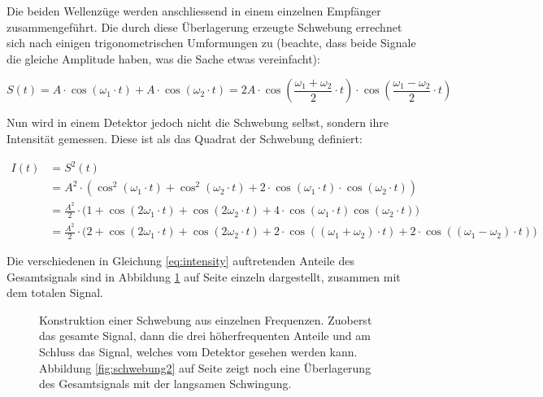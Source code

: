 Die beiden  Wellenz\"uge werden  anschliessend in einem  einzelnen Empf\"anger
zusammengef\"uhrt. Die durch diese \"Uberlagerung erzeugte Schwebung errechnet
sich  nach  einigen  trigonometrischen  Umformungen zu  (beachte,  dass  beide
Signale die gleiche Amplitude haben, was die Sache etwas vereinfacht):

\begin{equation}
    \label{eq:schwebung}
    S(t) = A \cdot \cos(\omega_1 \cdot t) + A \cdot \cos(\omega_2 \cdot t)
         = 2 A \cdot
             \cos\left(
                 \frac{\omega_1 + \omega_2}{2} \cdot t
             \right)
             \cdot
             \cos\left(
                 \frac{\omega_1 - \omega_2}{2} \cdot t
             \right)
\end{equation}

Nun wird  in einem Detektor  jedoch nicht  die Schwebung selbst,  sondern ihre
Intensit\"at gemessen. Diese ist als das Quadrat der Schwebung definiert:

\begin{equation}
    \label{eq:intensity}
    \begin{split}
        I(t) &= S^2(t) \\
             &= A^2           \cdot \left( \cos^2(\omega_1 \cdot t) + \cos^2(\omega_2 \cdot t) + 2 \cdot \cos(\omega_1 \cdot t) \cdot \cos(\omega_2 \cdot t) \right) \\
             &= \frac{A^2}{2} \cdot \Big( 1 + \cos(2\omega_1 \cdot t) + \cos(2\omega_2 \cdot t) + 4 \cdot \cos(\omega_1 \cdot t)\cos(\omega_2 \cdot t) \Big) \\
             &= \frac{A^2}{2} \cdot \Big( 2 + \cos(2\omega_1 \cdot t) + \cos(2\omega_2 \cdot t) + 2 \cdot \cos\left((\omega_1 + \omega_2) \cdot t \right) + 2 \cdot \cos\left( (\omega_1 - \omega_2) \cdot t \right) \Big)
    \end{split}
\end{equation}

Die  verschiedenen   in  Gleichung  \ref{eq:intensity}   auftretenden  Anteile
des   Gesamtsignals   sind   in  Abbildung   \ref{fig:schwebung}   auf   Seite
\pageref{fig:schwebung} einzeln dargestellt, zusammen mit dem totalen Signal.

\begin{figure}[h!t]
    \centering
    \resizebox{0.6\textwidth}{!}{}
    \caption{%
        Konstruktion  einer Schwebung  aus einzelnen  Frequenzen. Zuoberst das
        gesamte Signal, dann die drei h\"oherfrequenten Anteile und am Schluss
        das  Signal,  welches  vom  Detektor  gesehen  werden  kann. Abbildung
        \ref{fig:schwebung2}  auf  Seite \pageref{fig:schwebung2}  zeigt  noch
        eine \"Uberlagerung des Gesamtsignals mit der langsamen Schwingung.
    }
    \label{fig:schwebung}
\end{figure}

